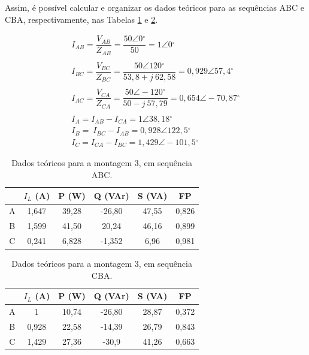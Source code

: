 \documentclass[a4paper,12pt,oneside,openany,table,xcdraw]{article}
\begin{document}
Assim, é possível calcular e organizar os dados teóricos para as sequências ABC e CBA, respectivamente, nas Tabelas \ref{m3:teorico:abc} e \ref{m3:teorico:cba}.
\vspace{0.2cm}

\begin{equation*}
\begin{array}{l}
I_{AB} =\dfrac{V_{AB}}{Z_{AB}} =\dfrac{50\angle 0\mathrm{^{\circ }}}{50} =1\angle 0\mathrm{^{\circ }}\\
\\
I_{BC} =\dfrac{V_{BC}}{Z_{BC}} =\dfrac{50\angle 120\mathrm{^{\circ }}}{53,8+j\ 62,58} =0,929\angle 57,4\mathrm{^{\circ }}\\
\\
I_{AC} =\dfrac{V_{CA}}{Z_{CA}} =\dfrac{50\angle -120\mathrm{^{\circ }}}{50-j\ 57,79} =0,654\angle -70,87\mathrm{^{\circ }}\\
\\
I_{A} =I_{AB} -I_{CA} =1\angle 38,18\mathrm{^{\circ }}\\
I_{B} =\ I_{BC} -I_{AB} =0,928\angle 122,5\mathrm{^{\circ }}\\
I_{C} =I_{CA} -I_{BC} =1,429\angle -101,5\mathrm{^{\circ }}
\end{array}
\end{equation*}
\vspace{0.3cm}

\begin{table}[H]
\centering \small {}
\caption{Dados teóricos para a montagem 3, em sequência ABC.}
\label{m3:teorico:abc}
\begin{tabular}{|c|c|c|c|c|c|}
\hline
 & $I_L$ (A) & P (W) & Q (VAr) & S (VA) & FP \\ \hline
A & 1,647 & 39,28 & -26,80 & 47,55 & 0,826 \\ \hline
B & 1,599 & 41,50 & 20,24 & 46,16 & 0,899 \\ \hline
C & 0,241 & 6,828 & -1,352 & 6,96 & 0,981 \\ \hline
\end{tabular}
\end{table}

\begin{table}[H]
\centering \small {}
\caption{Dados teóricos para a montagem 3, em sequência CBA.}
\label{m3:teorico:cba}
\begin{tabular}{|c|c|c|c|c|c|}
\hline
 & $I_L$ (A) & P (W) & Q (VAr) & S (VA) & FP \\ \hline
A & 1 & 10,74 & -26,80 & 28,87 & 0,372 \\ \hline
B & 0,928 & 22,58 & -14,39 & 26,79 & 0,843 \\ \hline
C & 1,429 & 27,36 & -30,9 & 41,26 & 0,663 \\ \hline
\end{tabular}
\end{table}
\end{document}
